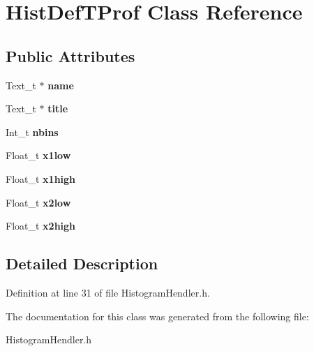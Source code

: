 \section{Hist\-Def\-T\-Prof Class Reference}
\label{classHistDefTProf}
\subsection*{Public Attributes}
\begin{DoxyCompactItemize}
\item 
Text\-\_\-t $\ast$ {\bfseries name}\label{classHistDefTProf_a1894d8d5730b8abdfeffd8a3f5d0beeb}

\item 
Text\-\_\-t $\ast$ {\bfseries title}\label{classHistDefTProf_aab4c4420203e400b6f10c4f43d153fd8}

\item 
Int\-\_\-t {\bfseries nbins}\label{classHistDefTProf_a0c53e1051faaa15f0557e11695a055c1}

\item 
Float\-\_\-t {\bfseries x1low}\label{classHistDefTProf_aad2a2a5fcb0a725bf10b4c5bda864b8d}

\item 
Float\-\_\-t {\bfseries x1high}\label{classHistDefTProf_a8068c5c5fe7abcb413a194dec16abf1b}

\item 
Float\-\_\-t {\bfseries x2low}\label{classHistDefTProf_a32a7c2a0354f6d65312d8e5765ea4b2e}

\item 
Float\-\_\-t {\bfseries x2high}\label{classHistDefTProf_aeb4e159f0e2815ca022fd892001f2cb5}

\end{DoxyCompactItemize}


\subsection{Detailed Description}


Definition at line 31 of file Histogram\-Hendler.\-h.



The documentation for this class was generated from the following file\-:\begin{DoxyCompactItemize}
\item 
Histogram\-Hendler.\-h\end{DoxyCompactItemize}
